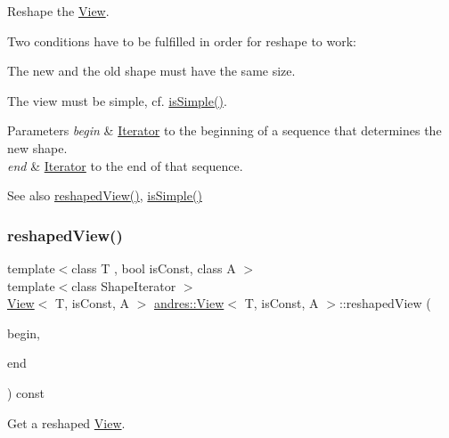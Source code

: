 Reshape the \hyperlink{classandres_1_1View}{View}.

Two conditions have to be fulfilled in order for reshape to work\+:
\begin{DoxyItemize}
\item The new and the old shape must have the same size.
\item The view must be simple, cf. \hyperlink{classandres_1_1View_a3f6bf9dc15389945a30f01a000c1d2a5}{is\+Simple()}.
\end{DoxyItemize}
\begin{DoxyParams}{Parameters}
{\em begin} & \hyperlink{classandres_1_1Iterator}{Iterator} to the beginning of a sequence that determines the new shape. \\
\hline
{\em end} & \hyperlink{classandres_1_1Iterator}{Iterator} to the end of that sequence.\\
\hline
\end{DoxyParams}
\begin{DoxySeeAlso}{See also}
\hyperlink{classandres_1_1View_a7d399d00c3f90eb3e2d928812ef24ec6}{reshaped\+View()}, \hyperlink{classandres_1_1View_a3f6bf9dc15389945a30f01a000c1d2a5}{is\+Simple()} 
\end{DoxySeeAlso}
\mbox{\label{classandres_1_1View_a7d399d00c3f90eb3e2d928812ef24ec6}} 
\subsubsection{\texorpdfstring{reshaped\+View()}{reshapedView()}}
{\footnotesize\ttfamily template$<$class T , bool is\+Const, class A $>$ \\
template$<$class Shape\+Iterator $>$ \\
\hyperlink{classandres_1_1View}{View}$<$ T, is\+Const, A $>$ \hyperlink{classandres_1_1View}{andres\+::\+View}$<$ T, is\+Const, A $>$\+::reshaped\+View (\begin{DoxyParamCaption}\item[{Shape\+Iterator}]{begin,  }\item[{Shape\+Iterator}]{end }\end{DoxyParamCaption}) const\hspace{0.3cm}{\ttfamily [inline]}}

Get a reshaped \hyperlink{classandres_1_1View}{View}.

